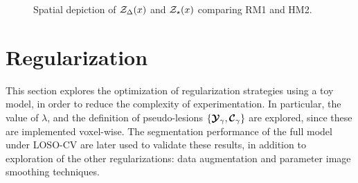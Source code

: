 \begin{figure}
 \\[0.5em]
  \\[0.5em]
  \\[0.5em]
  \\[0.5em]
  \\[0.5em]
  \caption{Spatial depiction of $\mathcal{Z}_{\Delta}(x)$ and $\mathcal{Z}_{\star}(x)$ comparing RM1 and HM2.}%
  \label{fig:jsep-diff-x-narm}
\end{figure}

\clearpage
\section{Regularization}
This section explores the optimization of regularization strategies using a toy model,
in order to reduce the complexity of experimentation.
In particular,
the value of $\lambda$,
and the definition of pseudo-lesions $\{\bm{\mathcal{Y}}_{\gamma},\bm{\mathcal{C}}_{\gamma}\}$
are explored, since these are implemented voxel-wise.
The segmentation performance of the full model under LOSO-CV
are later used to validate these results,
in addition to exploration of the other regularizations:
data augmentation and parameter image smoothing techniques.
